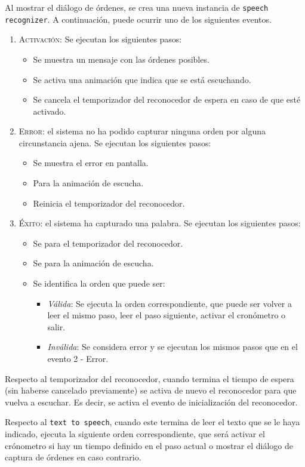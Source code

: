 Al mostrar el diálogo de órdenes, se crea una nueva instancia de
\texttt{speech recognizer}. A continuación, puede ocurrir uno de los siguientes
eventos.
\begin{enumerate}
\item \textsc{Activación}: Se ejecutan los siguientes pasos:
  \begin{itemize}
  \item Se muestra un mensaje con las órdenes posibles.
  \item Se activa una animación que indica que se está escuchando.
  \item Se cancela el temporizador del reconocedor de espera en caso de que esté
    activado.
  \end{itemize}
\item \textsc{Error}: el sistema no ha podido capturar ninguna orden por alguna
  circunstancia ajena. Se ejecutan los siguientes pasos:
  \begin{itemize}
  \item Se muestra el error en pantalla.
  \item Para la animación de escucha.
  \item Reinicia el temporizador del reconocedor.
  \end{itemize}
\item \textsc{Éxito}: el sistema ha capturado una palabra. Se ejecutan los
  siguientes pasos:
  \begin{itemize}
  \item Se para el temporizador del reconocedor.
  \item Se para la animación de escucha.
  \item Se identifica la orden que puede ser:
    \begin{itemize}
    \item \textit{Válida}: Se ejecuta la orden correspondiente, que puede ser
      volver a leer el mismo paso, leer el paso siguiente, activar el cronómetro
      o salir.
    \item \textit{Inválida}: Se considera error y se ejecutan los mismos pasos
      que en el evento 2 - Error.
    \end{itemize}  
  \end{itemize}
\end{enumerate}

Respecto al temporizador del reconocedor, cuando termina el tiempo de espera
(sin haberse cancelado previamente) se activa de nuevo el reconocedor para
que vuelva a escuchar. Es decir, se activa el evento de inicialización del
reconocedor.

Respecto al \texttt{text to speech}, cuando este termina de leer el texto que
se le haya indicado, ejecuta la siguiente orden correspondiente, que será
activar el crónometro si hay un tiempo definido en el paso actual o mostrar el
diálogo de captura de órdenes en caso contrario.

